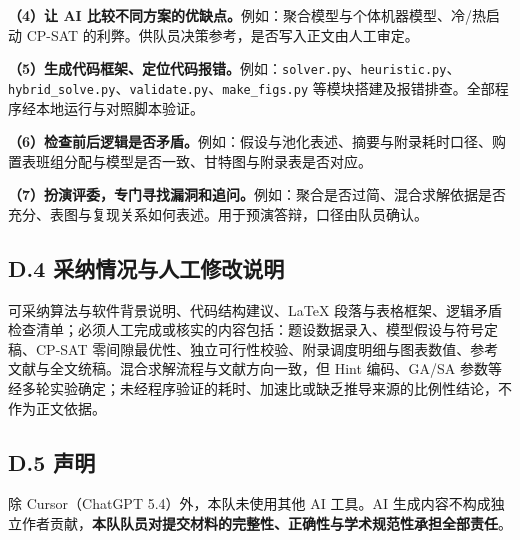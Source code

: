 \documentclass[12pt,a4paper]{ctexart}
\begin{document}
\textbf{（4）让 AI 比较不同方案的优缺点。}例如：聚合模型与个体机器模型、冷/热启动 CP-SAT 的利弊。供队员决策参考，是否写入正文由人工审定。

\textbf{（5）生成代码框架、定位代码报错。}例如：\texttt{solver.py}、\texttt{heuristic.py}、\texttt{hybrid\_solve.py}、\texttt{validate.py}、\texttt{make\_figs.py} 等模块搭建及报错排查。全部程序经本地运行与对照脚本验证。

\textbf{（6）检查前后逻辑是否矛盾。}例如：假设与池化表述、摘要与附录耗时口径、购置表班组分配与模型是否一致、甘特图与附录表是否对应。

\textbf{（7）扮演评委，专门寻找漏洞和追问。}例如：聚合是否过简、混合求解依据是否充分、表图与复现关系如何表述。用于预演答辩，口径由队员确认。

\subsection*{D.4 采纳情况与人工修改说明}

可采纳算法与软件背景说明、代码结构建议、\LaTeX{} 段落与表格框架、逻辑矛盾检查清单；必须人工完成或核实的内容包括：题设数据录入、模型假设与符号定稿、CP-SAT 零间隙最优性、独立可行性校验、附录调度明细与图表数值、参考文献与全文统稿。混合求解流程与文献方向一致，但 Hint 编码、GA/SA 参数等经多轮实验确定；未经程序验证的耗时、加速比或缺乏推导来源的比例性结论，不作为正文依据。

\subsection*{D.5 声明}

除 Cursor（ChatGPT 5.4）外，本队未使用其他 AI 工具。AI 生成内容不构成独立作者贡献，\textbf{本队队员对提交材料的完整性、正确性与学术规范性承担全部责任}。

\end{document}
